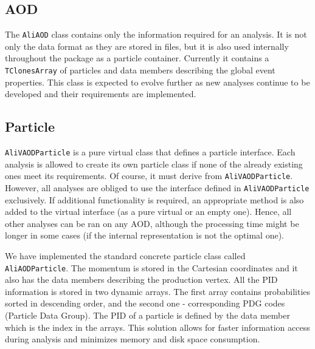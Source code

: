 \documentclass[12pt,a4paper,twoside]{article}
\begin{document}
{%

\subsection{AOD}

The \texttt{AliAOD} class contains only the information required
for an analysis. It is not only the data format as they are
stored in files, but it is also used internally throughout the package
as a particle container.  
Currently it contains a \texttt{TClonesArray} of particles and 
data members describing the global event properties. 
This class is expected to evolve further as new analyses continue to be 
developed and their requirements are implemented. 


\subsection{Particle}

\texttt{AliVAODParticle} is a pure virtual class that defines a particle
interface.
Each analysis is allowed to create its own particle class 
if none of the already existing ones meet its requirements. 
Of course, it must derive  from \texttt{AliVAODParticle}. 
However, all analyses are obliged to 
use the interface defined in \texttt{AliVAODParticle} exclusively.
If additional functionality is required, an appropriate 
method is also added to the virtual interface (as a pure virtual or an empty one).
Hence, all other analyses can be ran on any AOD, although the processing time 
might be longer in some cases (if the internal representation is not 
the optimal one).

We have implemented the standard concrete particle class 
called \texttt{AliAODParticle}. The momentum is stored in the
Cartesian coordinates and it also has the data members 
describing the production vertex. All the PID information
is stored in two dynamic arrays. The first array contains
probabilities sorted in descending order,
and the second one  - corresponding PDG codes (Particle Data Group).
The PID of a particle is defined by the data member which is 
the index in the arrays. This solution allows for faster information
access during analysis and minimizes memory and disk space consumption.



}
\end{document}
